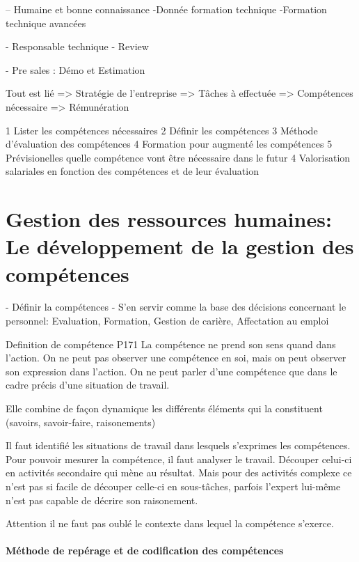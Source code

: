 -- Humaine et bonne connaissance
-Donnée formation technique
-Formation technique avancées

- Responsable technique
- Review

- Pre sales : Démo et Estimation


Tout est lié => Stratégie de l'entreprise => Tâches à effectuée => Compétences nécessaire => Rémunération


1 Lister les compétences nécessaires
2 Définir les compétences 
3 Méthode d'évaluation des compétences
4 Formation pour augmenté les compétences
5 Prévisionelles quelle compétence vont être nécessaire dans le futur
4 Valorisation salariales en fonction des compétences et de leur évaluation






\section{Gestion des ressources humaines: Le développement de la gestion des compétences}

- Définir la compétences
- S'en servir comme la base des décisions concernant le personnel: Evaluation, Formation, Gestion de carière, Affectation au emploi

Definition de compétence  P171
La compétence ne prend son sens quand dans l'action. On ne peut pas observer une compétence en soi, mais on peut observer son expression dans l'action. On ne peut parler d'une compétence que dans le cadre précis d'une situation de travail.  

Elle combine de façon dynamique les différents éléments qui la constituent (savoirs, savoir-faire, raisonements) 

Il faut identifié les situations de travail dans lesquels s'exprimes les compétences. 
Pour pouvoir mesurer la compétence, il faut analyser le travail. Découper celui-ci en activités secondaire qui mène au résultat.
Mais pour des activités complexe ce n'est pas si facile de découper celle-ci en sous-tâches, parfois l'expert lui-même n'est pas capable de décrire son raisonement.

Attention il ne faut pas oublé le contexte dans lequel la compétence s'exerce. 

\paragraph{Méthode de repérage et de codification des compétences}



